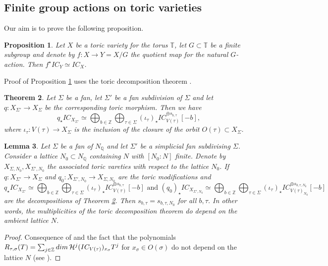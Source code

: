 \documentclass[11pt, reqno]{amsart}
\theoremstyle{plain}
\newtheorem{theorem}{Theorem}[section]
\newtheorem{lemma}[theorem]{Lemma}
\newtheorem{proposition}[theorem]{Proposition}
\theoremstyle{definition}
\theoremstyle{remark}
\begin{document}
\subsection{Finite group actions on toric varieties}
Our aim is to prove the following proposition.
\begin{proposition}\label{theo-finitegrouptoric}
Let $X$ be a toric variety for the torus $\mathbb{T}$, let $G\subset \mathbb{T}$ be a finite subgroup and
denote by $f: X\rightarrow Y =  X/G$ the quotient map for the natural $G$-action. Then $f^{\star}IC_{Y}\simeq IC_{X}$.
\end{proposition}
Proof of Proposition \ref{theo-finitegrouptoric} uses the toric decomposition theorem \cite{CMM18}. 
\begin{theorem}\cite[Theorem D]{CMM18}\label{decomptoric}
Let $\Sigma$ be a fan, let $\Sigma'$ be a fan subdivision of $\Sigma$ and let $q: X_{\Sigma'}\rightarrow X_{\Sigma}$
be the corresponding toric morphism. Then we have 
$$q_{\star}IC_{X_{\Sigma'}} \simeq \bigoplus_{b\in \mathbb{Z}}\bigoplus_{\tau \in \Sigma}(\iota_{\tau})_{\star}IC_{V(\tau)}^{\oplus s_{b, \tau}}[-b],$$
where $\iota_{\tau}: V(\tau)\rightarrow X_{\Sigma}$ is the inclusion of the closure of the orbit $O(\tau)\subset X_{\Sigma}$.
\end{theorem}

\begin{lemma}\label{lem-toricmultN0unic}
Let $\Sigma$ be a fan of $N_{\mathbb{Q}}$ and let $\Sigma'$ be a simplicial fan subdivising $\Sigma$. Consider a lattice $N_{0}\subset N_{\mathbb{Q}}$ containing $N$ with $[N_{0}: N]$ finite. Denote by $X_{\Sigma, N_{0}}, X_{\Sigma', N_{0}}$
the associated toric vareties with respect to the lattice $N_{0}$. If $q: X_{\Sigma'}\rightarrow X_{\Sigma}$ and $q_{0}: X_{\Sigma', N_{0}}\rightarrow X_{\Sigma, N_{0}}$ are the toric modifications and 
$$q_{\star}IC_{X_{\Sigma'}} \simeq \bigoplus_{b\in \mathbb{Z}}\bigoplus_{\tau \in \Sigma}(\iota_{\tau})_{\star}IC_{V(\tau)}^{\oplus s_{b, \tau}}[-b] \text{ and } (q_{0})_{\star}IC_{X_{\Sigma', N_{0}}} \simeq \bigoplus_{b\in \mathbb{Z}}\bigoplus_{\tau \in \Sigma}(\iota_{\tau})_{\star}IC_{V(\tau)_{N_{0}}}^{\oplus s_{b, \tau, N_{0}}}[-b]$$
are the decompositions of Theorem \ref{decomptoric}. Then $s_{b, \tau} =  s_{b, \tau, N_{0}}$ for all $b, \tau$. 
In other words, the multiplicities of the toric decomposition theorem do depend on the ambient lattice $N$. 
\end{lemma}
\begin{proof}
Consequence of \cite[Corollary 7.5]{CMM18} and the fact that the polynomials $R_{\tau, \sigma}(T) =  \sum_{j\in \mathbb{Z}}{\rm dim}\, \mathcal{H}^{j}(IC_{V(\tau)})_{x_{\sigma}}T^{j}$ for $x_{\sigma}\in O(\sigma)$
do not depend on the lattice $N$ (see \cite[Section 1, Theorem 1.2]{Fie91}).
\end{proof}
\end{document}
